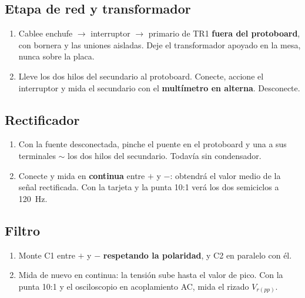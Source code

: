 \documentclass[11pt,a4paper]{article}
\begin{document}
\subsection{Etapa de red y transformador}
\begin{enumerate}[label=\textbf{Paso \arabic*.}, leftmargin=*, labelsep=0.6em, start=3]
\item Cablee enchufe $\rightarrow$ interruptor $\rightarrow$ primario de TR1 \textbf{fuera
del protoboard}, con bornera y las uniones aisladas. Deje el transformador apoyado en la
mesa, nunca sobre la placa.
\item Lleve los dos hilos del secundario al protoboard. Conecte, accione el interruptor y
mida el secundario con el \textbf{multímetro en alterna}. Desconecte.
\end{enumerate}

\subsection{Rectificador}
\begin{enumerate}[label=\textbf{Paso \arabic*.}, leftmargin=*, labelsep=0.6em, start=5]
\item Con la fuente desconectada, pinche el puente en el protoboard y una a sus terminales
$\sim$ los dos hilos del secundario. Todavía sin condensador.
\item Conecte y mida en \textbf{continua} entre $+$ y $-$: obtendrá el valor medio de la
señal rectificada. Con la tarjeta y la punta 10:1 verá los dos semiciclos a
\qty{120}{\hertz}.
\end{enumerate}

\subsection{Filtro}
\begin{enumerate}[label=\textbf{Paso \arabic*.}, leftmargin=*, labelsep=0.6em, start=7]
\item Monte C1 entre $+$ y $-$ \textbf{respetando la polaridad}, y C2 en paralelo con él.
\item Mida de nuevo en continua: la tensión sube hasta el valor de pico. Con la punta
10:1 y el osciloscopio en acoplamiento AC, mida el rizado $V_{r(pp)}$.
\end{enumerate}
\end{document}
